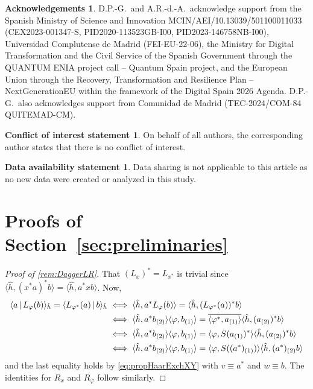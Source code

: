 \documentclass[a4paper,10pt]{amsart}
\newcommand{\eval}[2]{\langle #1 , #2\rangle}
\newcommand{\innerprod}[2]{\langle #1 \,|\, #2\rangle_{\smash{\hat{h}}}}
\theoremstyle{definition}
\newtheorem*{acknowledgements}{Acknowledgements}
\newtheorem*{conflictofinterest}{Conflict of interest statement}
\newtheorem*{dataavailability}{Data availability statement}
\begin{document}
\begin{acknowledgements}
D.P.-G.~and A.R.-d.-A.~acknowledge support from the Spanish Ministry of Science and Innovation MCIN/AEI/10.13039/501100011033 (CEX2023-001347-S, PID2020-113523GB-I00, PID2023-146758NB-I00), Universidad Complutense de Madrid (FEI-EU-22-06), the Ministry for Digital Transformation and the Civil Service of the Spanish Government through the QUANTUM ENIA project call -- Quantum Spain project, and the European Union through the Recovery, Transformation and Resilience Plan -- NextGenerationEU within the framework of the Digital Spain 2026 Agenda.
D.P.-G.\ also acknowledges support from Comunidad de Madrid (TEC-2024/COM-84 QUITEMAD-CM).
\end{acknowledgements}

\begin{conflictofinterest}
	On behalf of all authors, the corresponding author states that there is no conflict of interest.
\end{conflictofinterest}

\begin{dataavailability}
	Data sharing is not applicable to this article as no new data were created or analyzed in this study.
\end{dataavailability}




\appendix

\section{Proofs of Section~\ref{sec:preliminaries}}
\label{appendix:proofs2}

\begin{proof}[Proof of \cref{rem:DaggerLR}]
    That $(L_x)^* = L_{x^*}$ is trivial since $\eval{\hat{h}}{(x^* a)^* b} = \eval{\hat{h}}{a^* x b} $.
    Now,
    \begin{align*}
        \innerprod{a}{L_{\varphi}(b)} = \innerprod{L_{\varphi^*}(a)}{b}
        &\iff
        \eval{\hat{h}}{a^* L_{\varphi}(b)} = \eval{\hat{h}}{(L_{\varphi^*}(a))^* b}
        \\
        &\iff
        \eval{\hat{h}}{a^* b_{(2)}}\eval{\varphi}{b_{(1)}} = \overline{\eval{\varphi^*}{a_{(1)}}}\eval{\hat{h}}{(a_{(2)})^* b}
        \\
        &\iff
        \eval{\hat{h}}{a^* b_{(2)}}\eval{\varphi}{b_{(1)}} = \eval{\varphi}{S(a_{(1)})^*}\eval{\hat{h}}{(a_{(2)})^* b}
        \\
        &\iff
        \eval{\hat{h}}{a^* b_{(2)}} \eval{\varphi}{b_{(1)}} = \eval{\varphi}{S((a^*)_{(1)})}\eval{\hat{h}}{(a^*)_{(2)} b}
    \end{align*}
    and the last equality holds by \cref{eq:propHaarExchXY} with $v\equiv a^*$ and $w\equiv b$. The identities for $R_x$ and $R_\varphi$ follow similarly.
\end{proof}
\end{document}
